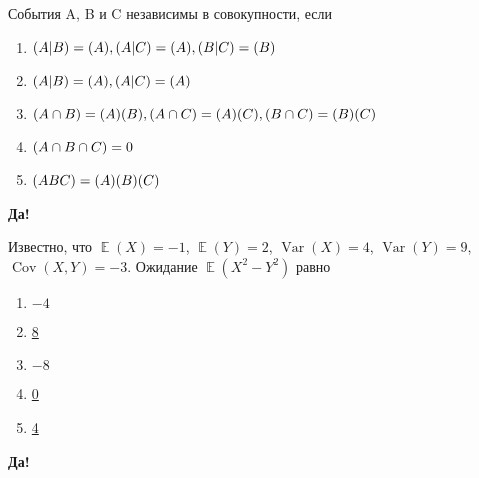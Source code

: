 \documentclass[t]{beamer}
\DeclareMathOperator{\Var}{Var}
\DeclareMathOperator{\Cov}{Cov}
\DeclareMathOperator{\E}{\mathbb{E}}
\let\P\relax
\DeclareMathOperator{\P}{\mathbb{P}}
\begin{document}
 \begin{frame} \label{16-Yes} 
\begin{block}{16} 

События A, B и C независимы в совокупности, если


 \end{block} 
\begin{enumerate} 
\item[] \hyperlink{16-No}{\beamergotobutton{}  $\P(A|B) = \P(A), \P(A|C) = \P(A), \P(B|C) = \P(B)$ }
\item[] \hyperlink{16-No}{\beamergotobutton{}  $\P(A|B) = \P(A), \P(A|C) = \P(A)$ }
\item[] \hyperlink{16-No}{\beamergotobutton{}  $\P(A\cap B) = \P(A)\P(B), \P(A\cap C) = \P(A)\P(C), \P(B\cap C) = \P(B)\P(C)$ }
\item[] \hyperlink{16-No}{\beamergotobutton{}  $\P(A \cap B \cap C) = 0$ }
\item[] \hyperlink{16-No}{\beamergotobutton{}  $\P(ABC) = \P(A) \P(B) \P(C)$ }
\end{enumerate} 

 \textbf{Да!} 
 \hyperlink{17}{}\end{frame} 


 \begin{frame} \label{17-Yes} 
\begin{block}{17} 

Известно, что $\E(X)=-1$, $\E(Y)=2$, $\Var(X)=4$, $\Var(Y)=9$, $\Cov(X,Y)=-3$. Ожидание $\E(X^2-Y^2)$ равно

  


 \end{block} 
\begin{enumerate} 
\item[] \hyperlink{17-No}{\beamergotobutton{} $-4$}
\item[] \hyperlink{17-No}{\beamergotobutton{} 8}
\item[] \hyperlink{17-Yes}{\beamergotobutton{} $-8$}
\item[] \hyperlink{17-No}{\beamergotobutton{} 0}
\item[] \hyperlink{17-No}{\beamergotobutton{} 4}
\end{enumerate} 

 \textbf{Да!} 
 \hyperlink{18}{}\end{frame} 
\end{document}

